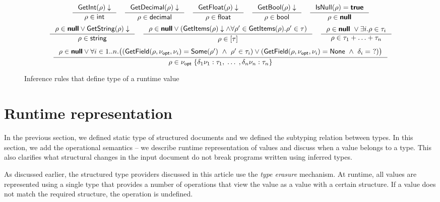 \documentclass[10pt]{sigplanconf}
\newcommand{\kvd}[1]{\textbf{\sffamily #1}}
\newcommand{\ident}[1]{\textnormal{\sffamily #1}}
\begin{document}
\begin{figure}[!b]
\hrulefill

\begin{equation*}
\inference
  {\ident{GetInt}(\rho)\downarrow}
  {\rho \in \ident{int}}
\quad
\inference
  {\ident{GetDecimal}(\rho)\downarrow}
  {\rho \in \ident{decimal}}
\quad
\inference
  {\ident{GetFloat}(\rho)\downarrow}
  {\rho \in \ident{float}}
\quad
\inference
  {\ident{GetBool}(\rho)\downarrow}
  {\rho \in \ident{bool}}
\quad
\inference
  {\ident{IsNull}(\rho)=\kvd{true}}
  {\rho \in \kvd{null}}
\end{equation*}\vspace{0.4em}
\begin{equation*}
\inference
  {\rho \in \kvd{null} \vee \ident{GetString}(\rho)\downarrow}
  {\rho \in \ident{string}}
\quad
\inference
  {
  \rho \in \kvd{null} \vee (\ident{GetItems}(\rho)\downarrow \wedge
  \forall \rho' \in \ident{GetItems}(\rho). \rho' \in \tau)
  }
  {\rho \in [\tau]}
\quad
\inference
  { \rho \in \kvd{null} ~\vee \exists i. \rho \in \tau_i }
  { \rho \in \tau_1 + \ldots  + \tau_n }
\end{equation*}\vspace{0.4em}
\begin{equation*}
\inference
  {
  \rho \in \kvd{null} \vee \forall i\in 1 .. n.
  \big((\ident{GetField}(\rho, \nu_{\ident{opt}}, \nu_i) = \ident{Some}(\rho') ~\wedge~ \rho' \in \tau_i) \vee 
  (\ident{GetField}(\rho, \nu_{\ident{opt}}, \nu_i) = \ident{None} ~\wedge~ \delta_i =~ ?)\big)
  }
  {\rho \in \nu_{\ident{opt}} \; \{ \delta_1 \nu_1 : \tau_1, \; \ldots \; , \delta_n \nu_n : \tau_n \}}
\end{equation*}

\caption{Inference rules that define type of a runtime value}
\label{fig:runtime-type}
\end{figure}
\section{Runtime representation}
\label{sec:operational}

In the previous section, we defined static type of structured documents and we defined the 
subtyping relation between types. In this section, we add the operational semantics -- we 
describe runtime representation of values and discuss when a value belongs to a type. This also
clarifies what structural changes in the input document do not break programs written using 
inferred types.

As discussed earlier, the structured type providers discussed in this article use the 
\emph{type erasure} mechanism. At runtime, all values are represented using a single type that
provides a number of operations that view the value as a value with a certain structure.
If a value does not match the required structure, the operation is undefined.
\end{document}

